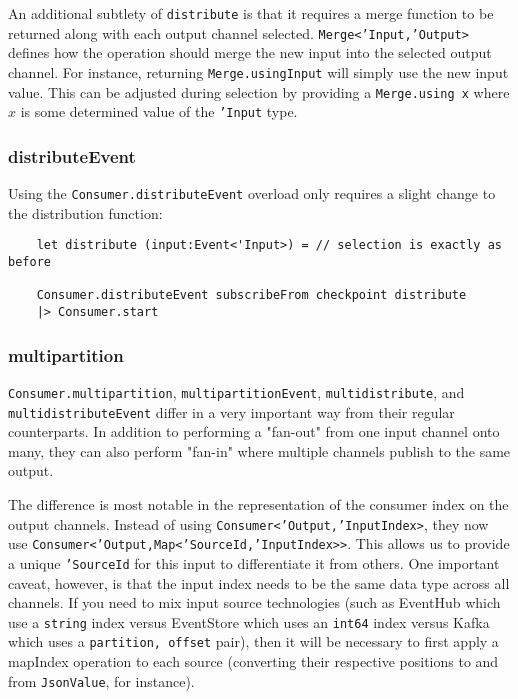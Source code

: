 \documentclass{article}
\begin{document}
An additional subtlety of \texttt{distribute} is that it requires a merge function to be returned along with each output channel selected.  \texttt{Merge<'Input,'Output>} defines how the operation should merge the new input into the selected output channel.  For instance, returning \texttt{Merge.usingInput} will simply use the new input value.  This can be adjusted during selection by providing a \texttt{Merge.using x} where $x$ is some determined value of the \texttt{'Input} type.

\subsubsection{distributeEvent}

Using the \texttt{Consumer.distributeEvent} overload only requires a slight change to the distribution function:

\begin{verbatim}
    let distribute (input:Event<'Input>) = // selection is exactly as before
        
    Consumer.distributeEvent subscribeFrom checkpoint distribute
    |> Consumer.start
\end{verbatim}

\subsubsection{multipartition}

\texttt{Consumer.multipartition}, \texttt{multipartitionEvent}, \texttt{multidistribute}, and \texttt{multidistributeEvent} differ in a very important way from their regular counterparts.  In addition to performing a "fan-out" from one input channel onto many, they can also perform "fan-in" where multiple channels publish to the same output.

The difference is most notable in the representation of the consumer index on the output channels. Instead of using \texttt{Consumer<'Output,'InputIndex>}, they now use \texttt{Consumer<'Output,Map<'SourceId,'InputIndex>>}.  This allows us to provide a unique \texttt{'SourceId} for this input to differentiate it from others. One important caveat, however, is that the input index needs to be the same data type across all channels.  If you need to mix input source technologies (such as EventHub which use a \texttt{string} index versus EventStore which uses an \texttt{int64} index versus Kafka which uses a \texttt{partition, offset} pair), then it will be necessary to first apply a mapIndex operation to each source (converting their respective positions to and from \texttt{JsonValue}, for instance).
\end{document}
